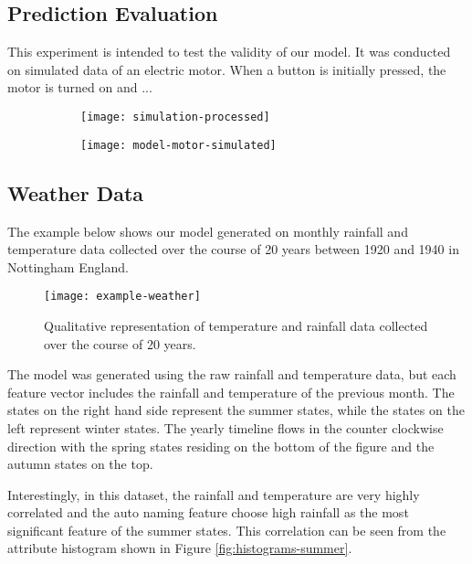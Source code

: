 \subsection{Prediction Evaluation}

This experiment is intended to test the validity of our model. It was conducted on simulated data of 
an electric motor. When a button is initially pressed, the motor is turned on and ...

\begin{figure}[h!]
	\centering
	\begin{subfigure}{.5\columnwidth}
	  	\centering
	  	\texttt{[image: simulation-processed]}
  		\caption{}
  		\label{fig:simulation}
	\end{subfigure}
	\begin{subfigure}{.5\columnwidth}
	  	\centering
	  	\texttt{[image: model-motor-simulated]}
	  	\caption{}
	  	\label{fig:example-motor}
	\end{subfigure}
\end{figure}

\subsection{Weather Data}
\label{sec:experiments-weather}

The example below shows our model generated on monthly rainfall and temperature data
collected over the course of 20 years between 1920 and 1940 in Nottingham England.

\begin{figure}[h!]
	\centering
	\texttt{[image: example-weather]}
	\caption{Qualitative representation of temperature and rainfall data collected over the course of 20 years.}
	\label{fig:example-weather}
\end{figure}

The model was generated using the raw rainfall and temperature data, but each feature vector includes
the rainfall and temperature of the previous month. The states on the right hand side represent the 
summer states, while the states on the left represent winter states. The yearly timeline flows in the
counter clockwise direction with the spring states residing on the bottom of the figure and the autumn
states on the top.

Interestingly, in this dataset, the rainfall and temperature are very highly correlated and the auto naming feature
choose high rainfall as the most significant feature of the summer states. This correlation can be seen
from the attribute histogram shown in Figure \ref{fig:histograms-summer}.

